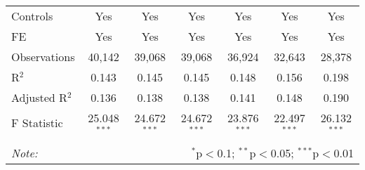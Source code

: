 \begin{table}[!htbp]
\begin{tabular}{@{\extracolsep{5pt}}lcccccc}
Controls & Yes & Yes & Yes & Yes & Yes & Yes \\ 
FE & Yes & Yes & Yes & Yes & Yes & Yes \\ 
Observations & 40,142 & 39,068 & 39,068 & 36,924 & 32,643 & 28,378 \\ 
R$^{2}$ & 0.143 & 0.145 & 0.145 & 0.148 & 0.156 & 0.198 \\ 
Adjusted R$^{2}$ & 0.136 & 0.138 & 0.138 & 0.141 & 0.148 & 0.190 \\ 
F Statistic & 25.048$^{***}$ & 24.672$^{***}$ & 24.672$^{***}$ & 23.876$^{***}$ & 22.497$^{***}$ & 26.132$^{***}$ \\ 
\hline 
\hline \\[-1.8ex] 
\textit{Note:}  & \multicolumn{6}{r}{$^{*}$p$<$0.1; $^{**}$p$<$0.05; $^{***}$p$<$0.01} \\ 
\end{tabular} 
\end{table} 
